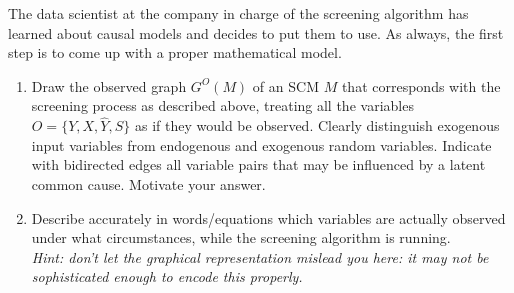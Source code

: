 The data scientist at the company in charge of the screening algorithm has learned about causal models and decides to put them to use. 
As always, the first step is to come up with a proper mathematical model.
\begin{enumerate}[label=\alph*)]
  \item Draw the observed graph $G^O(M)$ of an SCM $M$ that corresponds with the screening process as described above,
    treating all the variables $O = \{Y,X,\hat{Y},S\}$ as if they would be observed. 
    Clearly distinguish exogenous input variables from endogenous and exogenous random variables. 
    Indicate with bidirected edges all variable pairs that may be influenced by a latent common cause.
    Motivate your answer.
    \label{ex:cond_dist_selection_graph}
  \item Describe accurately in words/equations which variables are actually observed under what circumstances, while the screening algorithm is running.\\
    \emph{Hint:  don't let the graphical representation mislead you here: it may not be sophisticated enough to encode this properly.}
\end{enumerate}
